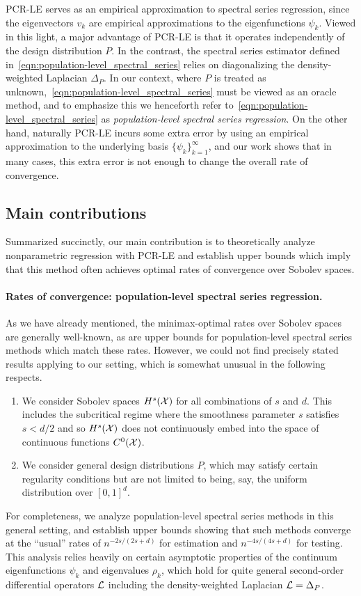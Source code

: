 PCR-LE serves as an empirical approximation to spectral series regression, since the eigenvectors $v_k$ are empirical approximations to the eigenfunctions $\psi_k$. Viewed in this light, a major advantage of PCR-LE is that it operates independently of the design distribution $P$. In the contrast, the spectral series estimator defined in~\eqref{eqn:population-level_spectral_series} relies on diagonalizing the density-weighted Laplacian $\Delta_P$. In our context, where $P$ is treated as unknown,~\eqref{eqn:population-level_spectral_series} must be viewed as an oracle method, and to emphasize this  we henceforth refer to~\eqref{eqn:population-level_spectral_series} as \emph{population-level spectral series regression}. On the other hand, naturally PCR-LE incurs some extra error by using an empirical approximation to the underlying basis $\{\psi_k\}_{k = 1}^{\infty}$, and our work shows that in many cases, this extra error is not enough to change the overall rate of convergence.

\subsection{Main contributions}
Summarized succinctly, our main contribution is to theoretically analyze nonparametric regression with PCR-LE and establish upper bounds which imply that this method often achieves optimal rates of convergence over Sobolev spaces.

\paragraph{Rates of convergence: population-level spectral series regression.}
As we have already mentioned, the minimax-optimal rates over Sobolev spaces are generally well-known, as are upper bounds for population-level spectral series methods which match these rates. However, we could not find precisely stated results applying to our setting, which is somewhat unusual in the following respects.
\begin{enumerate}
	\item We consider Sobolev spaces $H^s(\mathcal{X})$ for all combinations of $s$ and $d$. This includes the subcritical regime where the smoothness parameter $s$ satisfies $s < d/2$ and so $H^s(\mathcal{X})$ does not continuously embed into the space of continuous functions $C^0(\mathcal{X})$.
	\item We consider general design distributions $P$, which may satisfy certain regularity conditions but are not limited to being, say, the uniform distribution over $[0,1]^d$. 
\end{enumerate}
For completeness, we analyze population-level spectral series methods in this general setting, and establish upper bounds showing that such methods converge at the ``usual'' rates of $n^{-2s/(2s + d)}$ for estimation and $n^{-4s/(4s + d)}$ for testing. This analysis relies heavily on certain asymptotic properties of the continuum eigenfunctions $\psi_k$ and eigenvalues $\rho_k$, which hold for quite general second-order differential operators $\mathcal{L}$ including the density-weighted Laplacian $\mathcal{L} = \Delta_P$.

